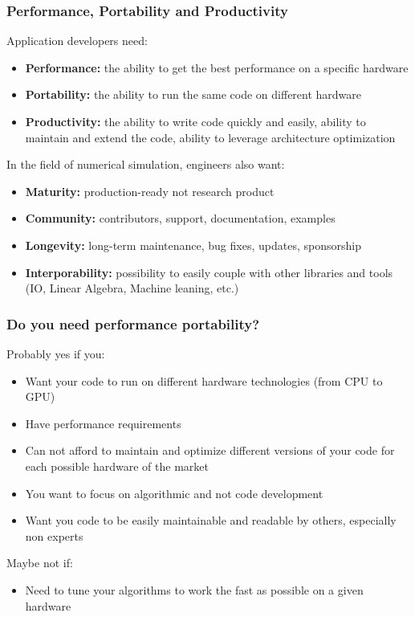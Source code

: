 \documentclass[aspectratio=169]{beamer}
\begin{document}

\begin{frame}
    \frametitle{Performance, Portability and Productivity}

Application developers need:

\begin{itemize}
    \item \textbf{Performance:} the ability to get the best performance on a specific hardware
    \item \textbf{Portability:} the ability to run the same code on different hardware
    \item \textbf{Productivity:} the ability to write code quickly and easily, ability to maintain and extend the code, ability to leverage architecture optimization
\end{itemize}

In the field of numerical simulation, engineers also want:

\begin{itemize}
    \item \textbf{Maturity:} production-ready not research product
    \item \textbf{Community:} contributors, support, documentation, examples
    \item \textbf{Longevity:} long-term maintenance, bug fixes, updates, sponsorship
    \item \textbf{Interporability:} possibility to easily couple with other libraries and tools (IO, Linear Algebra, Machine leaning, etc.)
\end{itemize}

\end{frame}

\begin{frame}
\frametitle{Do you need performance portability?}
Probably yes if you:
\begin{itemize}
    \item Want your code to run on different hardware technologies (from CPU to GPU)
    \item Have performance requirements
    \item Can not afford to maintain and optimize different versions of your code for each possible hardware of the market
    \item You want to focus on algorithmic and not code development
    \item Want you code to be easily maintainable and readable by others, especially non experts
\end{itemize}

Maybe not if:
\begin{itemize}
    \item Need to tune your algorithms to work the fast as possible on a given hardware
\end{itemize}

\end{frame}
\end{document}
